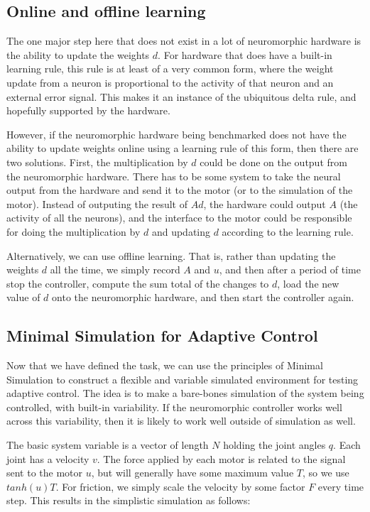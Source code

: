 \documentclass{frontiersSCNS} %
\begin{document}
\subsection{Online and offline learning}

The one major step here that does not exist in a lot of neuromorphic hardware is
the ability to update the weights $d$.  For hardware that does have a built-in
learning rule, this rule is at least of a very common form, where the weight
update from a neuron is proportional to the activity of that neuron and an
external error signal.  This makes it an instance of the ubiquitous delta rule,
and hopefully supported by the hardware.

However, if the neuromorphic hardware being benchmarked does not have the
ability to update weights online using a learning rule of this form, then there
are two solutions.  First, the multiplication by $d$ could be done on the
output from the neuromorphic hardware.  There has to be some system to take
the neural output from the hardware and send it to the motor (or to the simulation
of the motor).  Instead of outputing the result of $Ad$, the hardware could
output $A$ (the activity of all the neurons), and the interface to the motor
could be responsible for doing the multiplication by $d$ and updating $d$
according to the learning rule.

Alternatively, we can use offline learning.  That is, rather than updating
the weights $d$ all the time, we simply record $A$ and $u$, and then after
a period of time stop the controller, compute the sum total of the changes
to $d$, load the new value of $d$ onto the neuromorphic hardware, and then
start the controller again.

\subsection{Minimal Simulation for Adaptive Control}

Now that we have defined the task, we can use the principles of Minimal
Simulation to construct a flexible and variable simulated environment for
testing adaptive control.  The idea is to make a bare-bones simulation of
the system being controlled, with built-in variability.  If the neuromorphic
controller works well across this variability, then it is likely to work well
outside of simulation as well.

The basic system variable is a vector of length $N$ holding the joint angles $q$.  
Each joint has a velocity $v$.  The force applied by each motor is 
related to the signal sent to the motor $u$, but will generally have some
maximum value $T$, so we use $tanh(u)T$. For friction, we 
simply scale the velocity by some factor $F$ every time step.  
This results in the simplistic simulation as follows:
\end{document}
